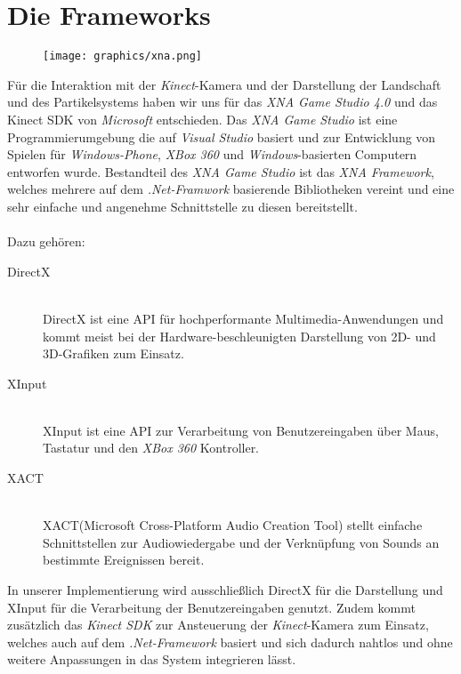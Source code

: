 \section{Die Frameworks}
\begin{Spacing}{\mylinespace}

\begin{figure}[h!]
	\centering
	\texttt{[image: graphics/xna.png]}
\end{figure}

Für die Interaktion mit der \textit{Kinect}-Kamera und der Darstellung der Landschaft und des Partikelsystems haben wir uns für das \textit{XNA Game Studio 4.0} und das Kinect SDK von \textit{Microsoft} entschieden. Das \textit{XNA Game Studio} ist eine Programmierumgebung die auf \textit{Visual Studio} basiert und zur Entwicklung von Spielen für \textit{Windows-Phone}, \textit{XBox 360} und \textit{Windows}-basierten Computern entworfen wurde. Bestandteil des \textit{XNA Game Studio} ist das \textit{XNA Framework}, welches mehrere auf dem \textit{.Net-Framwork} basierende Bibliotheken vereint und eine sehr einfache und angenehme Schnittstelle zu diesen bereitstellt.
\\\\
Dazu gehören:

\begin{description}
	\item[DirectX] \hfill \\
	DirectX ist eine API für hochperformante Multimedia-Anwendungen und kommt meist bei der Hardware-beschleunigten Darstellung von 2D- und 3D-Grafiken zum Einsatz. 
	\item[XInput] \hfill \\
	XInput ist eine API zur Verarbeitung von Benutzereingaben über Maus, Tastatur und den \textit{XBox 360} Kontroller.
	\item[XACT] \hfill \\
	XACT(Microsoft Cross-Platform Audio Creation Tool) stellt einfache Schnittstellen zur Audiowiedergabe und der Verknüpfung von Sounds an bestimmte Ereignissen bereit.
\end{description}

In unserer Implementierung wird ausschließlich DirectX für die Darstellung und XInput für die Verarbeitung der Benutzereingaben genutzt. Zudem kommt zusätzlich das \textit{Kinect SDK} zur Ansteuerung der \textit{Kinect}-Kamera zum Einsatz, welches auch auf dem \textit{.Net-Framework} basiert und sich dadurch nahtlos und ohne weitere Anpassungen in das System integrieren lässt.

\end{Spacing}
\newpage
\clearpage
